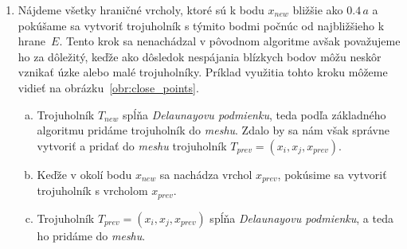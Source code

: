 \begin{enumerate}
{\begin{definition}
        \end{definition}

        Vizualizáciu tejto metriky môžeme vidieť na obrázku \ref{obr:edge_vertex_distance} a izočiary 
        metriky na obrázku \ref{obr:isocurves}.

        \begin{figure}
            \centerline{\texttt{[image: images/edge\_vertex\_distance]}}
            \caption[Vizualizácia vzdialenosti bodov od hrany]
            {Vizualizácia vzdialenosti bodov $P_1, ..., P_8$ od hrany $E=(A,B)$.}
            \label{obr:edge_vertex_distance}
        \end{figure}

        \begin{figure}
            \centerline{\texttt{[image: images/isocurves]}}
            \caption[Izočiary metriky]
            {Izočiary metriky z definície \ref{def:segment_point_distance}.}
            \label{obr:isocurves}
        \end{figure}



        Následne sa pokúšame vytvoriť trojuholník spĺňajúci podmienky opísané v kapitole 
        \ref{kap:triangle_conditions} s týmito vrcholmi počnúc od najbližšieho k hrane.
    }
    \item{
        Nájdeme všetky hraničné vrcholy, ktoré sú k bodu $x_{new}$ bližšie ako $0.4 \, a$
        a pokúšame sa vytvoriť trojuholník s týmito bodmi počnúc od najbližšieho k \mbox{hrane $E$}. 
        Tento krok sa nenachádzal v pôvodnom algoritme avšak považujeme ho za dôležitý, 
        keďže ako dôsledok nespájania blízkych bodov môžu neskôr vznikať úzke alebo malé trojuholníky. 
        Príklad využitia tohto kroku môžeme vidieť na \newline\mbox{obrázku \ref{obr:close_points}}. 
        \begin{enumerate}[a)]
            \item{
                Trojuholník $T_{new}$ spĺňa \textit{Delaunayovu podmienku}, teda podľa základného 
                algoritmu pridáme trojuholník do \textit{meshu}. Zdalo by sa nám však správne vytvoriť a 
                pridať do \textit{meshu} trojuholník $T_{prev} = (x_i, x_j, x_{prev})$. 
            }
            \item{
                Keďže v okolí bodu $x_{new}$ sa nachádza vrchol $x_{prev}$, pokúsime
                sa vytvoriť trojuholník s vrcholom $x_{prev}.$
            }
            \item{
                Trojuholník $T_{prev} = (x_i, x_j, x_{prev})$ spĺňa \textit{Delaunayovu podmienku},
                a teda ho pridáme do \textit{meshu}. 
            }
        \end{enumerate}
        
}
\end{enumerate}
